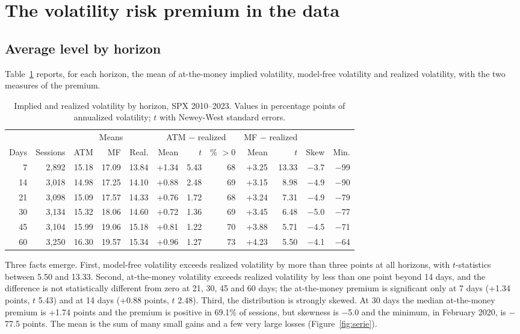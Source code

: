 \documentclass[11pt,a4paper]{article}
\begin{document}
\section{The volatility risk premium in the data}\label{sec:vrp}

\subsection{Average level by horizon}

Table~\ref{tab:oriz} reports, for each horizon, the mean of at-the-money implied volatility, model-free volatility and realized volatility, with the two measures of the premium.

\begin{table}[ht]\centering\small
\caption{Implied and realized volatility by horizon, SPX 2010--2023. Values in percentage points of annualized volatility; $t$ with Newey-West standard errors.}\label{tab:oriz}
\begin{tabular}{rrrrrrrrrrrr}\toprule
 & & \multicolumn{3}{c}{Means} & \multicolumn{3}{c}{ATM $-$ realized} & \multicolumn{2}{c}{MF $-$ realized} & & \\ \cmidrule(lr){3-5}\cmidrule(lr){6-8}\cmidrule(lr){9-10}
Days & Sessions & ATM & MF & Real. & Mean & $t$ & \% $>0$ & Mean & $t$ & Skew & Min. \\ \midrule
7 & 2,892 & 15.18 & 17.09 & 13.84 & +1.34 & 5.43 & 68 & +3.25 & 13.33 & $-$3.7 & $-$99 \\
14 & 3,018 & 14.98 & 17.25 & 14.10 & +0.88 & 2.48 & 69 & +3.15 & 8.98 & $-$4.9 & $-$90 \\
21 & 3,098 & 15.09 & 17.57 & 14.33 & +0.76 & 1.72 & 68 & +3.24 & 7.31 & $-$4.9 & $-$79 \\
30 & 3,134 & 15.32 & 18.06 & 14.60 & +0.72 & 1.36 & 69 & +3.45 & 6.48 & $-$5.0 & $-$77 \\
45 & 3,104 & 15.99 & 19.06 & 15.18 & +0.81 & 1.22 & 70 & +3.88 & 5.71 & $-$4.5 & $-$71 \\
60 & 3,250 & 16.30 & 19.57 & 15.34 & +0.96 & 1.27 & 73 & +4.23 & 5.50 & $-$4.1 & $-$64 \\
\bottomrule\end{tabular}\end{table}

Three facts emerge. First, model-free volatility exceeds realized volatility by more than three points at all horizons, with $t$-statistics between 5.50 and 13.33. Second, at-the-money volatility exceeds realized volatility by less than one point beyond 14 days, and the difference is not statistically different from zero at 21, 30, 45 and 60 days; the at-the-money premium is significant only at 7 days (+1.34 points, $t$ 5.43) and at 14 days (+0.88 points, $t$ 2.48). Third, the distribution is strongly skewed. At 30 days the median at-the-money premium is +1.74 points and the premium is positive in 69.1\% of sessions, but skewness is $-$5.0 and the minimum, in February 2020, is $-$77.5 points. The mean is the sum of many small gains and a few very large losses (Figure~\ref{fig:serie}).
\end{document}
